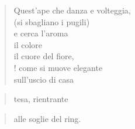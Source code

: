 
\begin{verse}
    Quest'ape che danza e volteggia,\\
    (si sbagliano i pugili)\\
    e cerca l'aroma\\
    il colore\\
    il cuore del fiore,\\!
    come si muove elegante\\
    sull'uscio di casa    
\end{verse}
\vspace{-0.9cm}
\begin{verse}
    \hfill tesa, rientrante
\end{verse}
\vspace{-0.9cm}
\begin{verse}
    \hfill alle soglie del ring.
\end{verse}